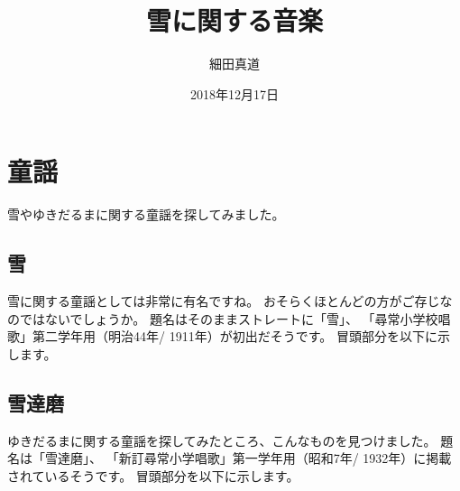 \documentclass{ltjsarticle}
\begin{document}
\title{雪に関する音楽}
\author{細田真道}
\date{2018年12月17日}
\maketitle

\tableofcontents
\clearpage

\section{童謡}

雪やゆきだるまに関する童謡を探してみました。

\subsection{雪}

雪に関する童謡としては非常に有名ですね。
おそらくほとんどの方がご存じなのではないでしょうか。
題名はそのままストレートに「雪」、
「尋常小学校唱歌」第二学年用（明治44年/ 1911年）が初出だそうです。
冒頭部分を以下に示します。

{%
\parindent 0pt
\noindent
\ifx\preLilyPondExample \undefined
\else
  \expandafter\preLilyPondExample
\fi
\def\lilypondbook{}%
%
\ifx\postLilyPondExample \undefined
\else
  \expandafter\postLilyPondExample
\fi
}

\subsection{雪達磨}

ゆきだるまに関する童謡を探してみたところ、こんなものを見つけました。
題名は「雪達磨」、
「新訂尋常小学唱歌」第一学年用（昭和7年/ 1932年）に掲載されているそうです。
冒頭部分を以下に示します。

{%
\parindent 0pt
\noindent
\ifx\preLilyPondExample \undefined
\else
  \expandafter\preLilyPondExample
\fi
\def\lilypondbook{}%
%
\ifx\postLilyPondExample \undefined
\else
  \expandafter\postLilyPondExample
\fi
}
\end{document}
